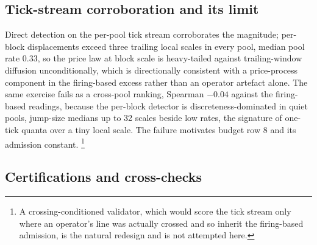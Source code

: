 \documentclass[11pt,a4paper]{article}
\theoremstyle{definition}
\theoremstyle{plain}
\theoremstyle{remark}
\begin{document}
\subsection{Tick-stream corroboration and its limit}\label{sec:tickstream}

Direct detection on the per-pool tick stream corroborates the magnitude; per-block displacements exceed three trailing local scales in every pool, median pool rate 0.33, so the price law at 
block scale is heavy-tailed against trailing-window diffusion unconditionally, which is directionally consistent with a price-process component in the firing-based excess rather than an operator 
artefact alone. The same exercise fails as a cross-pool ranking, Spearman $-0.04$ against the firing-based readings, because the per-block detector is discreteness-dominated in quiet pools, 
jump-size medians up to 32 scales beside low rates, the signature of one-tick quanta over a tiny local scale. The failure motivates budget row 8 and its admission constant.
\footnote{A crossing-conditioned validator, which would score the tick stream only where an operator's line was actually crossed and so inherit the firing-based admission, is the natural redesign 
and is not attempted here.}

\subsection{Certifications and cross-checks}\label{sec:certifications}
\end{document}
